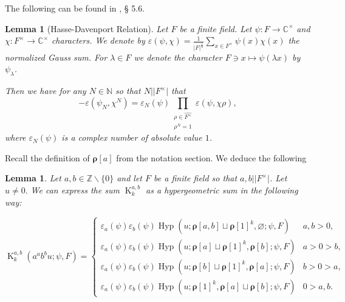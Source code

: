 \documentclass[12pt]{amsart}
\theoremstyle{plain}
\newtheorem{lem}[thm]{Lemma}
\theoremstyle{definition}
\theoremstyle{remark}
\numberwithin{equation}{section}
\newcommand{\CC}{\mathbb{C}}
\newcommand{\ZZ}{\mathbb{Z}}
\newcommand{\NN}{\mathbb{N}}
\DeclareMathOperator{\K}{K} %
\begin{document}
The following can be found in \cite{Katz88}, § 5.6. 

\begin{lem}[Hasse-Davenport Relation]\label{lem:Hasse-davenport}
    Let $F$ be a finite field. Let $\psi \colon F\to \CC^{\times}$ and $\chi \colon F^{\times}\to \CC^{\times}$ characters. We denote by $\varepsilon(\psi,\chi) = \frac{1}{\vert{F}\vert^{\frac{1}{2}}}\sum_{x\in F^{\times}}\psi(x)\chi(x)$ the normalized Gauss sum. For $\lambda \in F$ we denote the character $F\ni x \mapsto \psi(\lambda x)$ by $\psi_\lambda$.

Then we have for any $N\in \NN$ so that $N|\vert{F^{\times}}\vert $ that 
\begin{equation*}
    -\varepsilon(\psi_N,\chi^N) = \varepsilon_N(\psi)\prod_{\substack{\rho \in \widehat{F^{\times}}\\\rho^N=1}}\varepsilon(\psi,\chi\rho),
\end{equation*}
where $\varepsilon_N(\psi)$ is a complex number of absolute value $1$. 
\end{lem}

 Recall the definition of $\bm \rho[a]$ from the notation section. We deduce the following

\begin{lem}\label{l: hasse davenport}
Let $a,b\in \ZZ\smallsetminus\{0\}$ and let $F$ be a finite field so that $a,b|\vert{F^{\times}}\vert$. Let $u\neq 0.$
We can express the sum $\K_k^{a,b}$ as a hypergeometric sum in the following way: 

\begin{equation}\label{eq:Kk=hyp}    \K_k^{a,  b}(a^{a}b^{b}u;\psi,F) = \begin{cases}
        \varepsilon_a(\psi)\varepsilon_b(\psi)\operatorname{Hyp}(u;\bm{\rho}[a,b]\sqcup \bm{\rho}[1]^k,\varnothing;\psi,F)&  a,b>0, \\
        \varepsilon_a(\psi)\varepsilon_b(\psi)\operatorname{Hyp}(u;\bm{\rho}[a]\sqcup \bm{\rho}[1]^k,\bm{\rho}[b];\psi,F)& a>0>b, \\
        \varepsilon_a(\psi)\varepsilon_b(\psi)\operatorname{Hyp}(u;\bm{\rho}[b]\sqcup \bm{\rho}[1]^k,\bm{\rho}[a];\psi,F)& b>0>a,\\ \varepsilon_a(\psi)\varepsilon_b(\psi)
        \operatorname{Hyp}(u;\bm{\rho}[1]^k,\bm{\rho}[a]\sqcup \bm{\rho}[b];\psi,F)&0>a,b.\
    \end{cases}\end{equation}
\end{lem}
\end{document}
